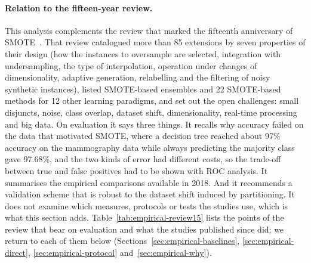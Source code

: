 \paragraph{Relation to the fifteen-year review.} This analysis complements the review that marked the fifteenth anniversary of SMOTE~\parencite{fernandez2018smote}. That review catalogued more than 85 extensions by seven properties of their design (how the instances to oversample are selected, integration with undersampling, the type of interpolation, operation under changes of dimensionality, adaptive generation, relabelling and the filtering of noisy synthetic instances), listed SMOTE-based ensembles and 22 SMOTE-based methods for 12 other learning paradigms, and set out the open challenges: small disjuncts, noise, class overlap, dataset shift, dimensionality, real-time processing and big data. On evaluation it says three things. It recalls why accuracy failed on the data that motivated SMOTE, where a decision tree reached about 97\% accuracy on the mammography data while always predicting the majority class gave 97.68\%, and the two kinds of error had different costs, so the trade-off between true and false positives had to be shown with ROC analysis. It summarises the empirical comparisons available in 2018. And it recommends a validation scheme that is robust to the dataset shift induced by partitioning. It does not examine which measures, protocols or tests the studies use, which is what this section adds. Table~\ref{tab:empirical-review15} lists the points of the review that bear on evaluation and what the studies published since did; we return to each of them below (Sections~\ref{sec:empirical-baselines}, \ref{sec:empirical-direct}, \ref{sec:empirical-protocol} and~\ref{sec:empirical-why}).



